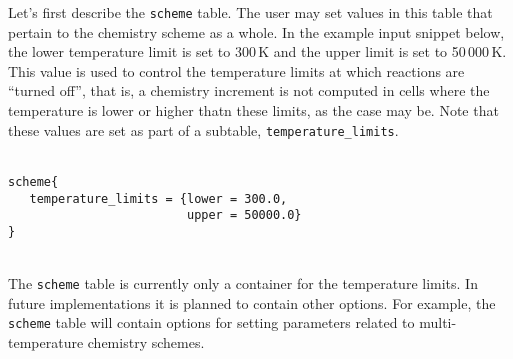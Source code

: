 Let's first describe the \texttt{scheme} table.
The user may set values in this table that pertain to the chemistry scheme as a whole.
In the example input snippet below, the lower temperature limit is set to 300\,K
and the upper limit is set to 50\,000\,K.
This value is used to control the temperature limits at which reactions are
``turned off'', that is, a chemistry increment is not computed in cells where the
temperature is lower or higher thatn these limits, as the case may be.
Note that these values are set as part of a subtable, \texttt{temperature\_limits}.\\
%
\topbar\\
\begin{verbatim}
scheme{
   temperature_limits = {lower = 300.0,
                         upper = 50000.0}
}
\end{verbatim}
\bottombar\\
%
The \texttt{scheme} table is currently only a container for the temperature limits.
In future implementations it is planned to contain other options.
For example, the \texttt{scheme} table will contain options for setting parameters related
to multi-temperature chemistry schemes.

